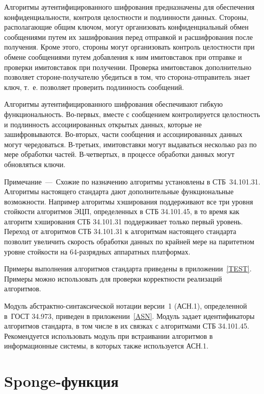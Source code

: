 Алгоритмы аутентифицированного шифрования предназначены для обеспечения 
конфиденциальности, контроля целостности и подлинности данных.
%
Стороны, располагающие общим ключом, могут организовать 
конфиденциальный обмен сообщениями путем их зашифрования 
перед отправкой и расшифрования после получения.
%
Кроме этого, стороны могут организовать контроль целостности при обмене 
сообщениями путем добавления к ним имитовставок при отправке 
и проверки имитовставок при получении.
%
Проверка имитовставок дополнительно позволяет стороне-получателю 
убедиться в том, что сторона-отправитель знает ключ,
т.~е. позволяет проверить подлинность сообщений.

Алгоритмы аутентифицированного шифрования обеспечивают гибкую функциональность.
%
Во-первых, вместе с сообщением контролируется целостность и подлинность 
ассоциированных открытых данных, которые не зашифровываются.
%
Во-вторых, части сообщения и ассоциированных данных могут чередоваться.
%
В-третьих, имитовставки могут выдаваться несколько раз по мере обработки 
частей.
%
В-четвертых, в процессе обработки данных могут обновляться ключи. 

\begin{note}
Примечание~---~Схожие по назначению алгоритмы установлены в СТБ~34.101.31. 
Алгоритмы настоящего стандарта дают дополнительные функциональные возможности.
Например алгоритмы хэширования поддерживают все три уровня стойкости 
алгоритмов ЭЦП, определенных в СТБ 34.101.45, в то время как алгоритм 
хэширования СТБ 34.101.31 поддерживает только первый уровень.
%
Переход от алгоритмов СТБ 34.101.31 к алгоритмам настоящего стандарта позволит 
увеличить скорость обработки данных по крайней мере на паритетном уровне 
стойкости на 64-разрядных аппаратных платформах.
\end{note}

Примеры выполнения алгоритмов стандарта приведены в приложении~\ref{TEST}.
Примеры можно использовать для проверки корректности реализаций 
алгоритмов.

Модуль абстрактно-синтаксической нотации версии~1 (АСН.1), определенной 
в~ГОСТ 34.973, приведен в приложении~\ref{ASN}. Модуль задает идентификаторы 
алгоритмов стандарта, в том числе в их связках с алгоритмами СТБ 34.101.45.
%
Рекомендуется использовать модуль при встраивании алгоритмов в информационные
системы, в которых также используется АСН.1.

\section{Sponge-функция}\label{COMMON.F}

